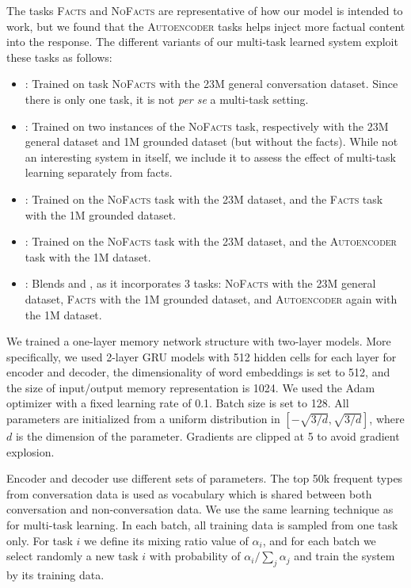 \documentclass[letterpaper]{article}
\begin{document}
The tasks \textsc{Facts} and \textsc{NoFacts} are representative of how our model is intended to work, but we found that the \textsc{Autoencoder} tasks helps inject more factual content into the response. The different variants of our multi-task learned system exploit these tasks as follows:
\begin{itemize}
   \item \sts{}: Trained on task \textsc{NoFacts} with the 23M general conversation dataset. Since there is only one task, it is not {\it per se} a multi-task setting.
   \item \MTask: Trained on two instances of the \textsc{NoFacts} task, respectively with the 23M general dataset and 1M grounded dataset (but without the facts). While not an interesting system in itself, we include it to assess the effect of multi-task learning separately from facts.
    \item \MTaskR: Trained on the \textsc{NoFacts} task with the 23M dataset, and the \textsc{Facts} task with the 1M grounded dataset.
    \item \MTaskF: Trained on the \textsc{NoFacts} task with the 23M dataset, and the \textsc{Autoencoder} task with the 1M dataset.
    \item \MTaskRF: Blends \MTaskF and \MTaskR, as it incorporates 3 tasks:
    \textsc{NoFacts} with the 23M general dataset,
    \textsc{Facts} with the 1M grounded dataset,
    and \textsc{Autoencoder} again with the 1M dataset.
\end{itemize}

We trained a one-layer memory network structure with two-layer \sts models.
More specifically,
we used 2-layer GRU models with 512 hidden cells for each layer for encoder and decoder,
the dimensionality of word embeddings is set to 512,
and the size of input/output memory representation is 1024.
We used the Adam optimizer with a fixed learning rate of 0.1.
Batch size is set to 128.
All parameters are initialized from a uniform distribution in $[-\sqrt {3/d}, \sqrt {3/d} ]$, where $d$ is the dimension of the parameter.
Gradients are clipped at 5 to avoid gradient explosion.

Encoder and decoder use different sets of parameters. The top 50k frequent types from conversation data is used as vocabulary which is shared between both conversation and non-conversation data.
We use the same learning technique as \cite{luong2015multi} for multi-task learning. In each batch, all training data is sampled from one task only. For task $i$ we define its mixing ratio value of $\alpha_i$, and for each batch we select randomly a new task $i$ with probability of ${\alpha_i}/{\sum_j \alpha_j}$ and train the system by its training data.
\end{document}
